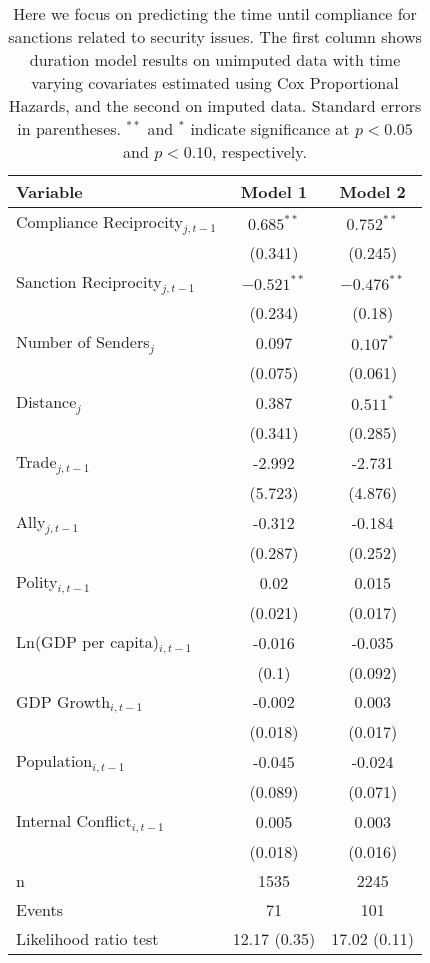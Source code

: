 \begin{table}[ht]
\centering
{\normalsize
\begin{tabular}{lcc}
 Variable & Model 1 & Model 2 \\ 
  \hline
\hline
Compliance Reciprocity$_{j,t-1}$ & $0.685^{\ast\ast}$ & $0.752^{\ast\ast}$ \\ 
   & (0.341) & (0.245) \\ 
  Sanction Reciprocity$_{j,t-1}$ & $-0.521^{\ast\ast}$ & $-0.476^{\ast\ast}$ \\ 
   & (0.234) & (0.18) \\ 
   \hline
Number of Senders$_{j}$ & 0.097 & $0.107^{\ast}$ \\ 
   & (0.075) & (0.061) \\ 
  Distance$_{j}$ & 0.387 & $0.511^{\ast}$ \\ 
   & (0.341) & (0.285) \\ 
  Trade$_{j,t-1}$ & -2.992 & -2.731 \\ 
   & (5.723) & (4.876) \\ 
  Ally$_{j,t-1}$ & -0.312 & -0.184 \\ 
   & (0.287) & (0.252) \\ 
   \hline
Polity$_{i,t-1}$ & 0.02 & 0.015 \\ 
   & (0.021) & (0.017) \\ 
  Ln(GDP per capita)$_{i,t-1}$ & -0.016 & -0.035 \\ 
   & (0.1) & (0.092) \\ 
  GDP Growth$_{i,t-1}$ & -0.002 & 0.003 \\ 
   & (0.018) & (0.017) \\ 
  Population$_{i,t-1}$ & -0.045 & -0.024 \\ 
   & (0.089) & (0.071) \\ 
  Internal Conflict$_{i,t-1}$ & 0.005 & 0.003 \\ 
   & (0.018) & (0.016) \\ 
   \hline
n & 1535 & 2245 \\ 
  Events & 71 & 101 \\ 
  Likelihood ratio test & 12.17 (0.35) & 17.02 (0.11) \\ 
   \hline
\hline
\end{tabular}
}
\caption{Here we focus on predicting the time until compliance for sanctions related to security issues. The first column shows duration model results on unimputed data with time varying covariates estimated using Cox Proportional Hazards, and the second on imputed data. Standard errors in parentheses. $^{**}$ and $^{*}$ indicate significance at $p< 0.05 $ and $p< 0.10 $, respectively.} 
\label{tab:regResultsNonEconSanctions}
\end{table}
